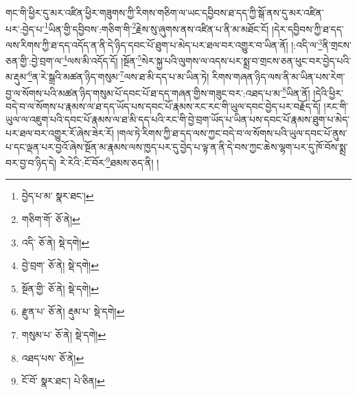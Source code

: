གང་གི་ཕྱིར་དུ་མར་འཛིན་ཕྱིར་གཟུགས་ཀྱི་རིགས་གཅིག་ལ་ཡང་དབྱིབས་ཐ་དད་ཀྱི་སྒོ་ནས་དུ་མར་འཛིན་པར་:བྱེད་པ་\footnote{བྱེད་པ་མ་  སྣར་ཐང་། }ཡིན་གྱི་དབྱིབས་:གཅིག་གི་\footnote{གཅིག་གོ་  ཅོ་ནེ། }རྗེས་སུ་ཞུགས་ནས་འཛིན་པ་ནི་མ་མཐོང་ངོ། །དེར་དབྱིབས་ཀྱི་ཐ་དད་ལས་རིགས་ཀྱི་ཐ་དད་འདོད་ན་ནི་དེ་ཉིད་དབང་པོ་ཐུག་པ་མེད་པར་ཐལ་བར་འགྱུར་བ་ཡིན་ནོ། །:འདི་ལ་\footnote{འདི་  ཅོ་ནེ།  སྡེ་དགེ། }ནི་གྲངས་ཅན་གྱི་:བྱེ་བྲག་ལ་\footnote{བྱེ་བྲག་  ཅོ་ནེ།  སྡེ་དགེ། }ལས་མི་འདོད་དོ། །སྔོན་\footnote{སྔོན་གྱི་  ཅོ་ནེ།  སྡེ་དགེ། }སེར་སྐྱ་པའི་ལུགས་ལ་འདས་པར་སྨྲ་བ་གྲངས་ཅན་ཕུང་བར་བྱེད་པའི་མ་རྡུམ་\footnote{རྫུན་པ་  ཅོ་ནེ། རྡུམ་པ་  སྡེ་དགེ། }ན་རེ་སྒྲའི་མཚན་ཉིད་གསུམ་\footnote{གསུམ་པ་  ཅོ་ནེ།  སྡེ་དགེ། }ལས་ཐ་མི་དད་པ་མ་ཡིན་ཏེ། རིགས་གཞན་ཉིད་ལས་ནི་མ་ཡིན་པས་རེག་བྱ་ལ་སོགས་པའི་མཚན་ཉིད་གསུམ་པོ་དབང་པོ་ཐ་དད་གཞན་གྱིས་གཟུང་བར་:འཐད་པ་མ་\footnote{འཐད་པས་  ཅོ་ནེ། }ཡིན་ནོ། །དེའི་ཕྱིར་བདེ་བ་ལ་སོགས་པ་རྣམས་ལ་ཐ་དད་ཡོད་པས་དབང་པོ་རྣམས་རང་རང་གི་ཡུལ་དབང་བྱེད་པར་བརྗོད་དོ། །རང་གི་ཡུལ་ལ་འཇུག་པའི་དབང་པོ་རྣམས་ལ་ཐ་མི་དད་པའི་རང་གི་བྱེ་བྲག་ཡོད་པ་ཡིན་པས་དབང་པོ་རྣམས་ཐུག་པ་མེད་པར་ཐལ་བར་འགྱུར་རོ་ཞེས་ཟེར་རོ། །གལ་ཏེ་རིགས་ཀྱི་ཐ་དད་ལས་ཀྱང་བདེ་བ་ལ་སོགས་པའི་ཡུལ་དབང་པོ་ནུས་པ་དང་ལྡན་པར་བྱའོ་ཞེས་སྔོན་མ་རྣམས་ལས་ཁྱད་པར་དུ་བྱེད་པ་ལྟ་ན་ནི་དེ་བས་ཀྱང་ཆེས་ལྷག་པར་དུ་ཁོ་བོས་སྨྲ་བར་བྱ་བ་ཉིད་དེ། རེ་རེའི་:ངོ་བོར་\footnote{ངོ་བོ་  སྣར་ཐང་།  པེ་ཅིན། }ཐམས་ཅད་ནི། །
